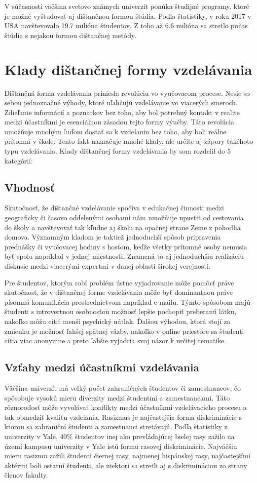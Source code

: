 \documentclass[10pt,twoside,slovak,a4paper]{article}
\begin{document}
	V súčasnosti väčšina svetovo známych univerzít ponúka študijné programy, ktoré je možné vyštudovať aj dištančnou formou štúdia. Podľa štatistiky, v roku 2017 v USA navštevovalo 19.7 milióna študentov. Z toho až 6.6 milióna  sa stretlo počas štúdia s nejakou formou dištančnej metódy. 

\section{Klady dištančnej formy vzdelávania}
	Dištančná forma vzdelávania priniesla revolúciu vo vyučovacom procese. Nesie so sebou jednoznačné výhody, ktoré uľahčujú vzdelávanie vo viacerých smeroch. Zdieľanie informácií a poznatkov bez toho, aby bol potrebný kontakt v realite medzi účastníkmi je esenciálnou zásadou tejto formy výučby. Táto revolúcia umožňuje mnohým ľuďom dostať sa k vzdelaniu bez toho, aby boli reálne prítomní v škole. Tento fakt naznačuje mnohé klady, ale určite aj zápory takéhoto typu vzdelávania. Klady dištančnej formy vzdelávania by som rozdelil do 5 kategórií:

\subsection{Vhodnosť}
	Skutočnosť, že dištančné vzdelávanie spočíva v edukačnej činnosti medzi geograficky či časovo oddelenými osobami nám umožňuje upustiť od cestovania do školy a navštevovať tak kľudne aj školu na opačnej strane Zeme z pohodlia domova. Významným kladom je taktiež jednoduchší spôsob pripravenia prednášky či vyučovacej hodiny s hosťom, keďže všetky prítomné osoby nemusia byť spolu napríklad v jednej miestnosti. Znamená to aj jednoduchšiu realizáciu diskusie medzi viacerými expertmi v danej oblasti širokej verejnosti.

	Pre študentov, ktorým robí problém ústne vyjadrovanie môže pomôcť práve skutočnosť, že v dištančnej forme vzdelávania môže byť dominantnou práve písomná komunikácia prostredníctvom napríklad e-mailu. Týmto spôsobom majú študenti s introvertnou osobnosťou možnosť lepšie pochopiť preberanú látku, nakoľko môžu cítiť menší psychický nátlak. Ďalšou výhodou, ktorá stojí za zmienku je možnosť ľahšej spätnej väzby, nakoľko v online priestore sa študenti cítia viac anonymne a preto ľahšie vyjadria svoj názor k určitej tematike.

\subsection{Vzťahy medzi účastníkmi vzdelávania}
	Väčšina univerzít má veľký počet zahraničných študentov či zamestnancov, čo spôsobuje vysokú mieru diverzity medzi študentmi a zamestnancami. Táto rôznorodosť môže vyvolávať konflikty medzi účastníkmi vzdelávacieho procesu a tak obmedziť kvalitu vzdelania. Rasizmus je najčastejšia forma diskriminácie s ktorou sa zahraniční študenti a zamestnanci stretávajú. Podľa štatistiky z univerzity v Yale, 40\% študentov inej ako prevládajúcej bielej rasy zažilo na území kampusu univerzity v Yale istú formu rasovej diskriminácie. Najväčšiu mieru rasizmu zažili študenti čiernej rasy, najmenej hispánskej rasy, najčastejšími aktérmi boli ostatní študenti, ale niektorí sa stretli aj s diskrimináciou zo strany členov fakulty.
\end{document}
